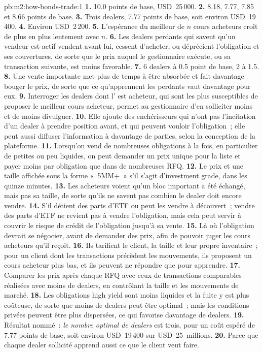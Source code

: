 \begin{solution}{pb:m2:how-bonds-trade:1}
\textbf{1.} 10.0 points de base, USD~25\,000.
\textbf{2.} 8.18, 7.77, 7.85 et 8.66 points de base.
\textbf{3.} Trois dealers, 7.77 points de base, soit environ USD~19\,400.
\textbf{4.} Environ USD~2\,200.
\textbf{5.} L'espérance du meilleur de $n$ cours acheteurs croît de plus en plus lentement avec $n$.
\textbf{6.} Les dealers perdants qui savent qu'un vendeur est actif vendent avant lui, cessent d'acheter, ou
déprécient l'obligation et ses couvertures, de sorte que le prix auquel le gestionnaire exécute, ou sa
transaction suivante, est moins favorable.
\textbf{7.} 6 dealers à 0.5 point de base, 2 à 1.5.
\textbf{8.} Une vente importante met plus de temps à être absorbée et fait davantage bouger le prix, de sorte que ce qu'apprennent
les perdants vaut davantage pour eux.
\textbf{9.} Interroger les dealers dont l' est acheteur, qui sont les plus susceptibles de
proposer le meilleur cours acheteur, permet au gestionnaire d'en solliciter moins et de moins divulguer.
\textbf{10.} Elle ajoute des enchérisseurs qui n'ont pas l'incitation d'un dealer à prendre position avant, et qui
peuvent vouloir l'obligation~; elle peut aussi diffuser l'information à davantage de parties, selon la conception de la plateforme.
\textbf{11.} Lorsqu'on vend de nombreuses obligations à la fois, en particulier de petites ou peu liquides, on peut
demander un prix unique pour la liste et payer moins par obligation que dans de nombreuses RFQ.
\textbf{12.} Le prix et une taille affichée sous la forme «~5MM$+$~» s'il s'agit d'investment grade,
dans les quinze minutes.
\textbf{13.} Les acheteurs voient qu'un bloc important a été échangé, mais pas sa taille, de sorte qu'ils ne
savent pas combien le dealer doit encore vendre.
\textbf{14.} S'il détient des parts d'ETF ou peut les vendre à découvert~; vendre des parts d'ETF ne revient pas
à vendre l'obligation, mais cela peut servir à couvrir le risque de crédit de l'obligation jusqu'à sa vente.
\textbf{15.} Là où l'obligation devrait se négocier, avant de demander des prix, afin de pouvoir juger les cours acheteurs
qu'il reçoit.
\textbf{16.} Ils tarifient le client, la taille et leur propre inventaire~; pour un client dont les
transactions précèdent les mouvements, ils proposent un cours acheteur plus bas, et ils peuvent ne répondre que pour apprendre.
\textbf{17.} Comparer les prix après chaque RFQ avec ceux de transactions comparables réalisées
avec moins de dealers, en contrôlant la taille et les mouvements de marché.
\textbf{18.} Les obligations high yield sont moins liquides et la fuite y est plus coûteuse, de sorte que moins de
dealers peut être optimal~; mais les conditions privées peuvent être plus dispersées, ce qui favorise davantage de dealers.
\textbf{19.} Résultat nommé~: \emph{le nombre optimal de dealers} est trois, pour un coût espéré de
7.77 points de base, soit environ USD~19\,400 sur USD~25~millions.
\textbf{20.} Parce que chaque dealer sollicité apprend aussi ce que le client veut faire.
\end{solution}

